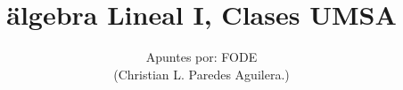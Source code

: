 \normalfont

\author{\Large Apuntes por: FODE \\ \small (Christian L. Paredes Aguilera.)}
\title{älgebra Lineal I, Clases UMSA}
\date{}
\pagestyle{empty}
\maketitle
\thispagestyle{empty}
\let\cleardoublepage\clearpage
\tableofcontents								%


 
\let\cleardoublepage\clearpage
